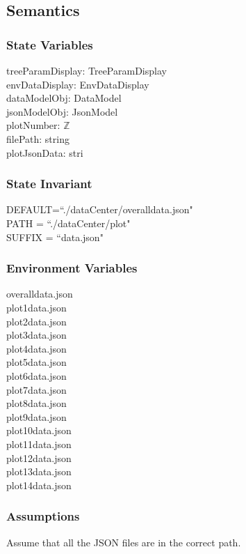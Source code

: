 \documentclass[12pt, titlepage]{article}
\begin{document}
\subsection{Semantics}

\subsubsection{State Variables}
treeParamDisplay: TreeParamDisplay\\
envDataDisplay: EnvDataDisplay\\
dataModelObj: DataModel\\
jsonModelObj: JsonModel\\
plotNumber: $\mathbb{Z}$\\
filePath: string\\
plotJsonData: stri\\
\subsubsection{State Invariant}
DEFAULT=``./dataCenter/overalldata.json"\\
PATH = ``./dataCenter/plot"\\
SUFFIX = ``data.json"
\subsubsection{Environment Variables}
overalldata.json\\
plot1data.json\\
plot2data.json\\
plot3data.json\\
plot4data.json\\
plot5data.json\\
plot6data.json\\
plot7data.json\\
plot8data.json\\
plot9data.json\\
plot10data.json\\
plot11data.json\\
plot12data.json\\
plot13data.json\\
plot14data.json

\subsubsection{Assumptions}

Assume that all the JSON files are in the correct path.
\end{document}
